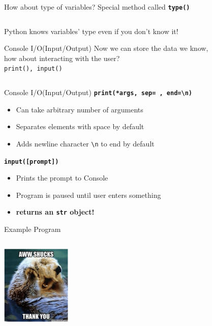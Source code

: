 		\begin{frame}{How about type of variables?}
			\LARGE
			Special method called \texttt{\textbf{type()}} 
			\inputminted[frame=single,framesep=2pt]{python3}{code-examples/types.py}
			Python knows variables' type even if you don't know it!
		\end{frame}

		\begin{frame}{Console I/O(Input/Output)}
			\LARGE
			Now we can store the data we know, \\
			\pause
			how about interacting with the user? \\
			\pause
			\texttt{print(), input()}
			\pause
			\inputminted[frame=single,framesep=2pt]{python3}{code-examples/io.py}
		\end{frame}

		\begin{frame}{Console I/O(Input/Output)}
			\huge
			\textbf{\texttt{print(*args, sep=\textquotesingle \ \textquotesingle, end=\textquotesingle \textbackslash n\textquotesingle )}}
			\pause
			\begin{itemize}
				\LARGE
				\item Can take arbitrary number of arguments
				\pause
				\item Separates elements with space by default
				\pause
				\item Adds newline character \texttt{\textquotesingle \textbackslash n\textquotesingle} to end by default
			\end{itemize}
			
			\pause
			\textbf{\texttt{input([prompt])}}
			\pause
			\begin{itemize}
				\LARGE
				\item Prints the prompt to Console
				\pause
				\item Program is paused until user enters something
				\pause
				\item \textbf{returns an \texttt{str} object!} 
			\end{itemize}
		\end{frame}

		\begin{frame}{Example Program}
			\inputminted[frame=single,framesep=2pt,fontsize=\LARGE]{python3}{code-examples/example_io.py}
			\pause
			\centering
			\includegraphics[width=0.25\textwidth]{images/thanks.png}

		\end{frame}
		
